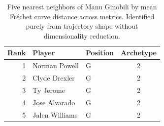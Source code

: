 \begin{table}[htbp]
  \centering\small
  \begin{tabular}{rllc}
    \toprule
    Rank & Player & Position & Archetype \\
    \midrule
    1 & Norman Powell & G & 2 \\
    2 & Clyde Drexler & G & 2 \\
    3 & Ty Jerome & G & 2 \\
    4 & Jose Alvarado & G & 2 \\
    5 & Jalen Williams & G & 2 \\
    \bottomrule
  \end{tabular}
  \caption{Five nearest neighbors of Manu Ginobili by mean Fr\'{e}chet curve distance across metrics. Identified purely from trajectory shape without dimensionality reduction.}
  \label{tab:Manu_Ginobili_frechet_curve_neighbors}
\end{table}

